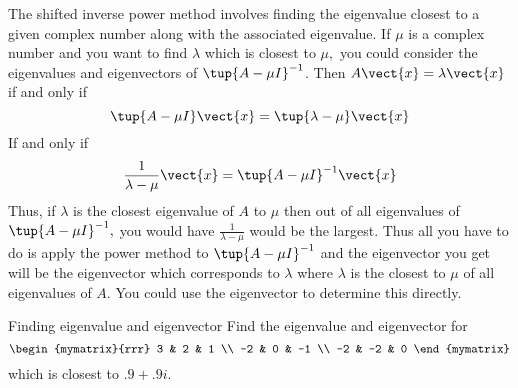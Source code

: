 The shifted inverse power method involves finding the eigenvalue closest to
a given complex number along with the associated eigenvalue. If $\mu $ is a
complex number and you want to find $\lambda $ which is closest to $\mu ,$
you could consider the eigenvalues and eigenvectors of $\tup{A-\mu
I} ^{-1}$. Then $A\vect{x}=\lambda \vect{x}$ if and only if 
\begin{equation*}
\tup{A-\mu I} \vect{x}=\tup{\lambda -\mu } \vect{x}
\end{equation*}
If and only if 
\begin{equation*}
\frac{1}{\lambda -\mu }\vect{x}=\tup{A-\mu I} ^{-1}\vect{x}
\end{equation*}
Thus, if $\lambda $ is the closest eigenvalue of $A$ to $\mu $ then out of
all eigenvalues of $\tup{A-\mu I} ^{-1},$ you would have $\frac{1}{
\lambda -\mu }$ would be the largest. Thus all you have to do is apply the
power method to $\tup{A-\mu I} ^{-1}$ and the eigenvector you get
will be the eigenvector which corresponds to $\lambda $ where $\lambda $ is
the closest to $\mu $ of all eigenvalues of $A$. You could use the
eigenvector to determine this directly.

\begin{example}{Finding eigenvalue and eigenvector}{}
Find the eigenvalue and eigenvector for 
\begin{equation*}
\begin{mymatrix}{rrr}
3 & 2 & 1 \\ 
-2 & 0 & -1 \\ 
-2 & -2 & 0
\end{mymatrix}
\end{equation*}
which is closest to $.9+.9i$.
\end{example}

